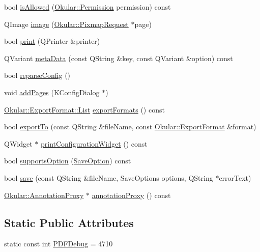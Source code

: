 \begin{DoxyCompactItemize}
\item 
bool \hyperlink{classPDFGenerator_ae60ab12202cf73cb8dba06e50b144460}{is\+Allowed} (\hyperlink{namespaceOkular_a3601f4e702453ddf1125476dd6e7577b}{Okular\+::\+Permission} permission) const 
\item 
Q\+Image \hyperlink{classPDFGenerator_a30b806bf421d9332bb2a6fb6ed3ce267}{image} (\hyperlink{classOkular_1_1PixmapRequest}{Okular\+::\+Pixmap\+Request} $\ast$page)
\item 
bool \hyperlink{classPDFGenerator_a797d52d48229d5725375e21d56c3c949}{print} (Q\+Printer \&printer)
\item 
Q\+Variant \hyperlink{classPDFGenerator_a1ec53a069478b38389ed689e5881f98d}{meta\+Data} (const Q\+String \&key, const Q\+Variant \&option) const 
\item 
bool \hyperlink{classPDFGenerator_a29ebf5643e2bafa551146a777e61b3bd}{reparse\+Config} ()
\item 
void \hyperlink{classPDFGenerator_a04e154f556588e29c27de23d1447816b}{add\+Pages} (K\+Config\+Dialog $\ast$)
\item 
\hyperlink{classOkular_1_1ExportFormat_a987d72c1a1456b8a983a37603a8fa78d}{Okular\+::\+Export\+Format\+::\+List} \hyperlink{classPDFGenerator_a50e45d9fdd09e64435fd342b77575aa4}{export\+Formats} () const 
\item 
bool \hyperlink{classPDFGenerator_a7a1a68fb2958335c8023e25265485288}{export\+To} (const Q\+String \&file\+Name, const \hyperlink{classOkular_1_1ExportFormat}{Okular\+::\+Export\+Format} \&format)
\item 
Q\+Widget $\ast$ \hyperlink{classPDFGenerator_afc09c9448b0942c506ca058ab01e6b36}{print\+Configuration\+Widget} () const 
\item 
bool \hyperlink{classPDFGenerator_ad1da694c1f5836ac61c26ec50a80b2c8}{supports\+Option} (\hyperlink{classOkular_1_1SaveInterface_ada9624051ff917ec66ca12b6d6684399}{Save\+Option}) const 
\item 
bool \hyperlink{classPDFGenerator_abf4927ecbbffacb3eefd8aeff58c0a62}{save} (const Q\+String \&file\+Name, Save\+Options options, Q\+String $\ast$error\+Text)
\item 
\hyperlink{classOkular_1_1AnnotationProxy}{Okular\+::\+Annotation\+Proxy} $\ast$ \hyperlink{classPDFGenerator_ade566b79f079689dcddef87ae5faf1d5}{annotation\+Proxy} () const 
\end{DoxyCompactItemize}
\subsection*{Static Public Attributes}
\begin{DoxyCompactItemize}
\item 
static const int \hyperlink{classPDFGenerator_ab548883f17326b0a73d3a1b07cae0f8d}{P\+D\+F\+Debug} = 4710
\end{DoxyCompactItemize}
